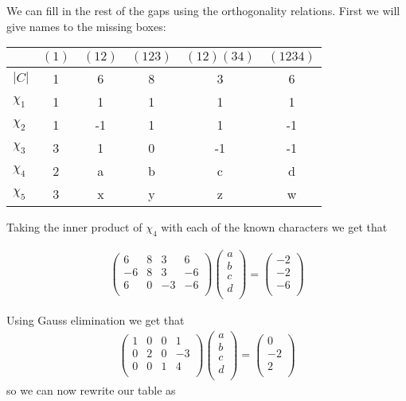 \documentclass[11pt]{article} \usepackage{amssymb}
\begin{document}
We can fill in the rest of the gaps using the orthogonality
relations. First we will give names to the missing boxes:
\begin{table}[h]
\begin{center}
{\small
\begin{tabular}{ l | c | c | c | c | c }
  & $(1)$ & $(12)$ & $(123)$ & $(12)(34)$ & $(1234)$ \\
\hline
$|C|$ & 1 & 6 & 8 & 3 & 6\\
\hline
$\chi_1$ & 1 & 1 & 1 & 1 & 1\\
$\chi_2$ & 1 & -1 & 1 & 1 & -1\\
$\chi_3$ & 3 & 1 & 0 & -1 & -1\\
$\chi_4$ & 2 & a & b & c & d\\
$\chi_5$ & 3 & x & y & z & w\\
\end{tabular}
}
\end{center}
\end{table}

Taking the inner product of $\chi_4$ with each of the known characters
 we get that

\begin{align*}
  \begin{pmatrix}
    6 & 8 & 3 & 6 \\
    -6 & 8 & 3 & -6\\
    6 & 0 & -3 & -6\\
  \end{pmatrix}
  \begin{pmatrix}
    a\\
    b\\
    c\\
    d\\
  \end{pmatrix}
  =
  \begin{pmatrix}
    -2\\
    -2\\
    -6\\
  \end{pmatrix}
\end{align*}

Using Gauss elimination we get that
\begin{align*}
  \begin{pmatrix}
    1 & 0 & 0 & 1 \\
    0 & 2 & 0 & -3\\
    0 & 0 & 1 & 4\\
  \end{pmatrix}
  \begin{pmatrix}
    a\\
    b\\
    c\\
    d\\
  \end{pmatrix}
  =
  \begin{pmatrix}
    0\\
    -2\\
    2\\
  \end{pmatrix}
\end{align*}
so we can now rewrite our table as 
\end{document}
